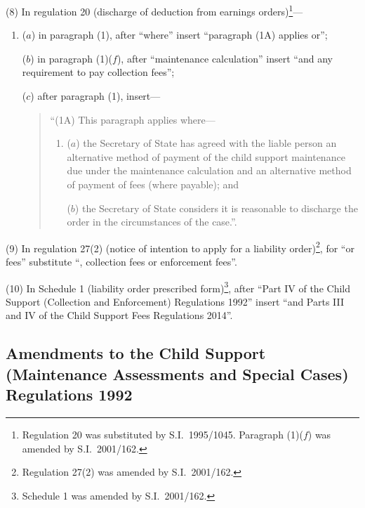 \documentclass[12pt,a4paper]{article}
\begin{document}
(8) In regulation 20 (discharge of deduction from earnings orders)\footnote{Regulation 20 was substituted by S.I.~1995/1045. Paragraph (1)($f$)  was amended by S.I.~2001/162.}—
\begin{enumerate}\item[]
($a$) in paragraph (1), after “where” insert “paragraph (1A) applies or”;

($b$) in paragraph (1)($f$), after “maintenance calculation” insert “and any requirement to pay collection fees”;

($c$) after paragraph (1), insert—
\begin{quotation}
“(1A) This paragraph applies where—
\begin{enumerate}\item[]
($a$) the Secretary of State has agreed with the liable person an alternative method of payment of the child support maintenance due under the maintenance calculation and an alternative method of payment of fees (where payable); and

($b$) the Secretary of State considers it is reasonable to discharge the order in the circumstances of the case.”.
\end{enumerate}
\end{quotation}
\end{enumerate}

(9) In regulation 27(2) (notice of intention to apply for a liability order)\footnote{Regulation 27(2) was amended by S.I.~2001/162.}, for “or fees” substitute “, collection fees or enforcement fees”.

(10) In Schedule 1 (liability order prescribed form)\footnote{Schedule 1 was amended by S.I.~2001/162.}, after “Part IV of the Child Support (Collection and Enforcement) Regulations 1992” insert “and Parts III and IV of the Child Support Fees Regulations 2014”.


\subsection[3. Amendments to the Child Support (Maintenance Assessments and Special Cases) Regulations 1992]{Amendments to the Child Support (Maintenance Assessments and Special Cases) Regulations 1992}
\end{document}
